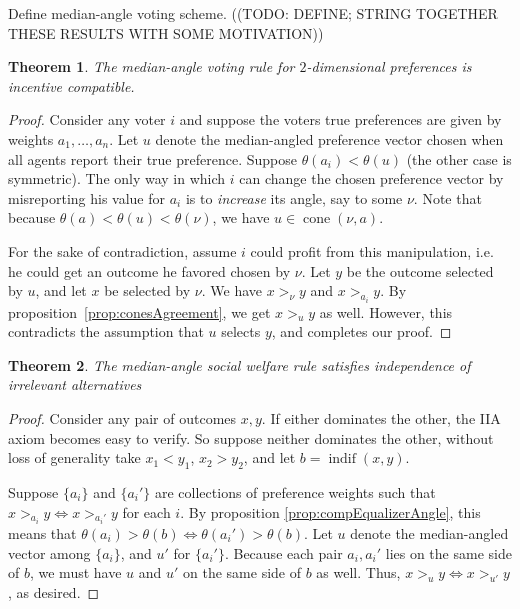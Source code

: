 \documentclass[12pt]{article}
\newtheorem{theorem}{Theorem}
\DeclareMathOperator*{\cone}{cone}
\DeclareMathOperator*{\indif}{indif}
\newcommand{\1}[1]{\mathds{1}[{#1}]}
\begin{document}
  Define median-angle voting scheme.
  ((TODO: DEFINE; STRING TOGETHER THESE RESULTS WITH SOME MOTIVATION))

  \begin{theorem}
    The median-angle voting rule for $2$-dimensional preferences
    is incentive compatible.
  \end{theorem}
  \begin{proof}
    Consider any voter $i$ and suppose the voters true preferences 
    are given by weights $a_1,\ldots,a_n$.
    Let $u$ denote the median-angled preference vector chosen when all
    agents report their true preference.
    Suppose $\theta(a_i) < \theta(u)$ (the other case is symmetric).
    The only way in which $i$ can change the chosen preference vector
    by misreporting his value for $a_i$
    is to \emph{increase} its angle, say to some $\nu$.
    Note that because $\theta(a) < \theta(u) < \theta(\nu)$,
    we have $u \in \cone(\nu,a)$.

    For the sake of contradiction, assume $i$ could profit from this
    manipulation, i.e. he could get an outcome he favored chosen by $\nu$.
    Let $y$ be the outcome selected by $u$, and let $x$ be selected by $\nu$.
    We have $x >_\nu y$ and $x >_{a_i} y$.
    By proposition~\ref{prop:conesAgreement}, we get $x >_u y$ as well.
    However, this contradicts the assumption that $u$ selects $y$,
    and completes our proof.
  \end{proof}

  \begin{theorem}
    The median-angle social welfare rule satisfies independence of irrelevant
    alternatives
  \end{theorem}
  \begin{proof}
    Consider any pair of outcomes $x,y$. If either dominates the other, the
    IIA axiom becomes easy to verify.
    So suppose neither dominates the other, without loss of generality take
    $x_1 < y_1$, $x_2 > y_2$, and let $b = \indif(x,y)$.

    Suppose $\{a_i\}$ and $\{a_i'\}$ are collections of preference weights such
    that $x>_{a_i} y \iff x>_{a_i'} y$ for each $i$.
    By proposition \ref{prop:compEqualizerAngle},
    this means that $\theta(a_i) > \theta(b) \iff \theta(a_i') > \theta(b)$.
    Let $u$ denote the median-angled vector among $\{a_i\}$,
    and $u'$ for $\{a_i'\}$.
    Because each pair $a_i, a_i'$ lies on the same side of $b$,
    we must have $u$ and $u'$ on the same side of $b$ as well.
    Thus, $x >_u y \iff x >_{u'} y$, as desired.
  \end{proof}
\end{document}
